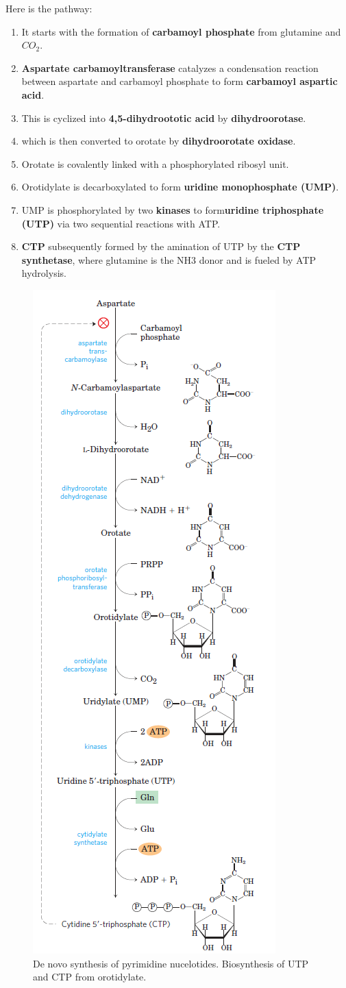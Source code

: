 \documentclass[../main.tex]{subfiles}
\begin{document}
Here is the pathway:
\begin{enumerate}
	\item It starts with the formation of \textbf{\gls{carbamoyl phosphate}} from glutamine and $CO_{2}$.
	\item \textbf{\gls{Aspartate carbamoyltransferase}} catalyzes a condensation reaction between aspartate and carbamoyl phosphate to form \textbf{\gls{carbamoyl aspartic acid}}.
	\item This is cyclized into \textbf{\gls{4,5-dihydroototic acid}} by \textbf{\gls{dihydroorotase}}. 
	\item which is then converted to orotate by \textbf{\gls{dihydroorotate oxidase}}.
	\item Orotate is covalently linked with a phosphorylated ribosyl unit.
	\item Orotidylate is decarboxylated to form \textbf{\gls{uridine monophosphate (UMP)}}.
	\item UMP is phosphorylated by two \textbf{\gls{kinases}} to form\textbf{\gls{uridine triphosphate (UTP)}} via two sequential reactions with ATP.
	\item \textbf{\gls{CTP}} subsequently formed by the amination of UTP by the \textbf{\gls{CTP synthetase}}, where glutamine is the NH3 donor and is fueled by ATP hydrolysis.
\end{enumerate}

\begin{figure}[H]
	\centering
	\includegraphics[width=0.3\linewidth]{pyri_path}
	\caption{De novo synthesis of pyrimidine nucelotides. Biosynthesis of UTP and CTP from orotidylate.}
	\label{fig:pyripath}
\end{figure}
\end{document}
